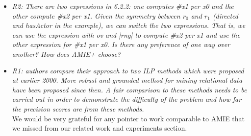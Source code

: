 \begin{figure*}[t!]
\begin{minipage}{.8\textwidth}
\begin{itemize}
   \item \textit{R2: There are two expressions in 6.2.2: one computes \#x1 per x0 and the other compute \#x2 per x1. 
   Given the symmetry between $r_0$ and $r_1$ (directed and hasActor in the example), we can switch the two expressions. 
   That is, we can use the expression with ov and |rng| to compute \#x2 per x1 and use the other expression for \#x1 per x0. 
   Is there any preference of one way over another? How does AMIE+ choose?\\  }
   
   
   
   
   
   
   \item \textit{R1: authors compare their approach to two ILP methods which were proposed at earlier 2000. More robust and grounded method for mining relational data have been proposed since then. A fair
comparison to these methods needs to be carried out in order to demonstrate the difficulty of the problem and how far the precision scores are from these methods.\\  }
We would be very grateful for any pointer to work comparable to AMIE that we missed from our related work and experiments section.

   
   
     \end{itemize}
\end{minipage}
\end{figure*}

